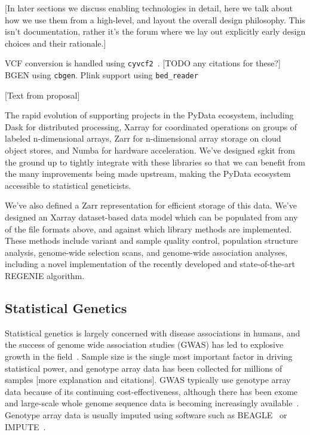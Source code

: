 \documentclass[9pt,lineno]{elife}
\newcommand{\toolname}[1]{\texttt{#1}}
\begin{document}
[In later sections we discuss enabling technologies in detail,
here we talk about how we use them from a high-level, and layout
the overall design philosophy. This isn't documentation, rather
it's the forum where we lay out explicitly early design choices
and their rationale.]

VCF conversion is handled using
\toolname{cyvcf2}~\citep{pedersen2017cyvcf2}.
[TODO any citations for these?]
BGEN using \toolname{cbgen}.
Plink support using \toolname{bed\_reader}

[Text from proposal]

The rapid evolution of supporting projects in the PyData ecosystem, including Dask for
distributed processing, Xarray for coordinated operations on groups of labeled
n-dimensional arrays, Zarr for n-dimensional array storage on cloud object
stores, and Numba for hardware acceleration. We’ve designed sgkit from the
ground up to tightly integrate with these libraries so that we can benefit from
the many improvements being made upstream, making the PyData ecosystem
accessible to statistical geneticists.

We've also defined a Zarr representation for efficient storage of this data.
We’ve designed an Xarray dataset-based data model which can be populated from
any of the file formats above, and against which library methods are
implemented. These methods include variant and sample quality control,
population structure analysis, genome-wide selection scans, and genome-wide
association analyses, including a novel implementation of the recently
developed and state-of-the-art REGENIE algorithm.



\subsection{Statistical Genetics}
Statistical genetics is largely concerned with disease associations
in humans, and the success of genome wide association studies (GWAS) has led
to explosive growth in the field~\citep{uffelmann2021genome}.
Sample size is the single most
important factor in driving statistical power, and
genotype array data has been collected for millions of samples
[more explanation and citations].
GWAS typically use genotype array data because of
its continuing cost-effectiveness, although there has been
exome~\citep{lek2016analysis,backman2021exome}
and large-scale whole genome sequence data is becoming increasingly
available~\citep{halldorsson2022sequences}.
Genotype array data is usually imputed using software such
as BEAGLE~\citep{browning2018one} or IMPUTE~\citep{howie2011genotype}.
\end{document}

